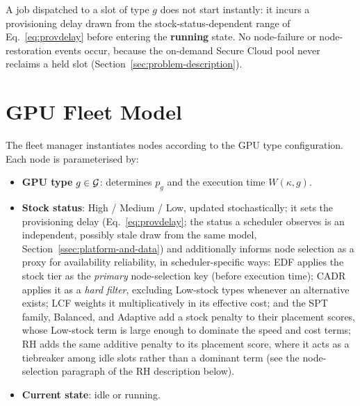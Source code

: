 A job dispatched to a slot of type $g$ does not start instantly: it incurs a provisioning delay drawn from the stock-status-dependent range of Eq.~\ref{eq:provdelay} before entering the \textbf{running} state. No node-failure or node-restoration events occur, because the on-demand Secure Cloud pool never reclaims a held slot (Section~\ref{sec:problem-description}).

\section{GPU Fleet Model}
\label{sec:gpu-fleet-model}

The fleet manager instantiates nodes according to the GPU type configuration. Each node is parameterised by:

\begin{itemize}
  \item \textbf{GPU type} $g \in \mathcal{G}$: determines $p_g$ and the execution time $W(\kappa, g)$.
  \item \textbf{Stock status}: High / Medium / Low, updated stochastically; it sets the provisioning delay (Eq.~\ref{eq:provdelay}; the status a scheduler observes is an independent, possibly stale draw from the same model, Section~\ref{ssec:platform-and-data}) and additionally informs node selection as a proxy for availability reliability, in scheduler-specific ways: EDF applies the stock tier as the \emph{primary} node-selection key (before execution time); CADR applies it as a \emph{hard filter}, excluding Low-stock types whenever an alternative exists; LCF weights it multiplicatively in its effective cost; and the SPT family, Balanced, and Adaptive add a stock penalty to their placement scores, whose Low-stock term is large enough to dominate the speed and cost terms; RH adds the same additive penalty to its placement score, where it acts as a tiebreaker among idle slots rather than a dominant term (see the node-selection paragraph of the RH description below).
  \item \textbf{Current state}: idle or running.
\end{itemize}

